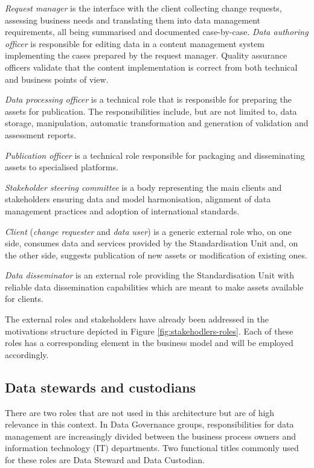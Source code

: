 	\textit{Request manager} is the interface with the client collecting change requests, assessing business needs and translating them into data management requirements, all being summarised and documented case-by-case. 
	\textit{Data authoring officer} is responsible for editing data in a content management system implementing the cases prepared by the request manager.
	Quality assurance officers validate that the content implementation is correct from both technical and business points of view. 
	
	\textit{Data processing officer} is a technical role that is responsible for preparing the assets for publication. The responsibilities include, but are not limited to, data storage, manipulation, automatic transformation and generation of validation and assessment reports. 
	
	\textit{Publication officer} is a technical role responsible for packaging and disseminating assets to specialised platforms.
	
	\textit{Stakeholder steering committee} is a body representing the main clients and stakeholders ensuring data and model harmonisation, alignment of data management practices and adoption of international standards.
	
	\textit{Client} (\textit{change requester} and \textit{data user}) is a generic external role who, on one side, consumes data and services provided by the Standardisation Unit and, on the other side, suggests publication of new assets or modification of existing ones. 
	
	\textit{Data disseminator} is an external role providing the Standardisation Unit with reliable data dissemination capabilities which are meant to make assets available for clients.

	The external roles and stakeholders have already been addressed in the motivations structure depicted in Figure \ref{fig:stakehodlers-roles}. Each of these roles has a corresponding element in the business model and will be employed accordingly.

    \subsection{Data stewards and custodians}
    There are two roles that are not used in this architecture but are of high relevance in this context. In Data Governance groups, responsibilities for data management are increasingly divided between the business process owners and information technology (IT) departments. Two functional titles commonly used for these roles are Data Steward and Data Custodian.
     
